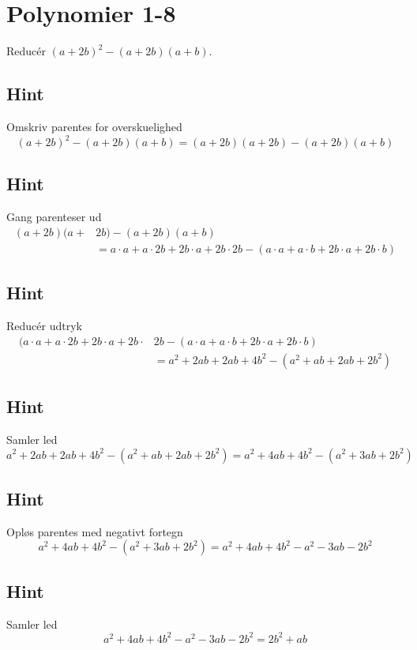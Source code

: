\documentclass{article}
\newenvironment{exercise}[1]{\newpage\section{#1}}{}
\newcommand{\answerbox}[1]{\fbox{$#1$}}
\newcommand{\hint}{\subsection*{Hint}}
\begin{document}
\newpage

\begin{exercise}{Polynomier 1-8}
	
	Reducér $(a+2b)^2 - (a+2b)(a+b)$.
	
	\answerbox{2b^2 + ab}
	
	\hint
	
	Omskriv parentes for overskuelighed
	\[
	(a+2b)^2 - (a+2b)(a+b) = (a+2b)(a+2b) - (a+2b)(a+b)
	\]
	
	
	\hint
	
	Gang parenteser ud
	\begin{align*}
	(a+2b)(a+&2b) - (a+2b)(a+b) \\
	&= a \cdot a + a \cdot 2b + 2b \cdot a + 2b \cdot 2b - (a \cdot a + a \cdot b + 2b \cdot a + 2b \cdot b)
	\end{align*}
	
	\hint
	
	Reducér udtryk
	\begin{align*}
	(a \cdot a + a \cdot 2b + 2b \cdot a + 2b \cdot &2b - (a \cdot a + a \cdot b + 2b \cdot a + 2b \cdot b) \\
	&= a^2 + 2ab+2ab+4b^2-(a^2+ab+2ab+2b^2) 
	\end{align*}
	
	
	\hint
	
	Samler led
	\[
	a^2 + 2ab+2ab+4b^2-(a^2+ab+2ab+2b^2)  = a^2 + 4ab + 4b^2 - (a^2 + 3ab + 2b^2)
	\]
	
	\hint
	
	Opløs parentes med negativt fortegn
	\[
	a^2 + 4ab + 4b^2 - (a^2 + 3ab + 2b^2) = a^2 + 4ab + 4b^2 - a^2 -3ab -2b^2
	\]
	
	
	\hint
	
	Samler led 
	\[
	a^2 + 4ab + 4b^2 - a^2 -3ab -2b^2 = 2b^2 + ab
	\]
	
\end{exercise}
\end{document}
